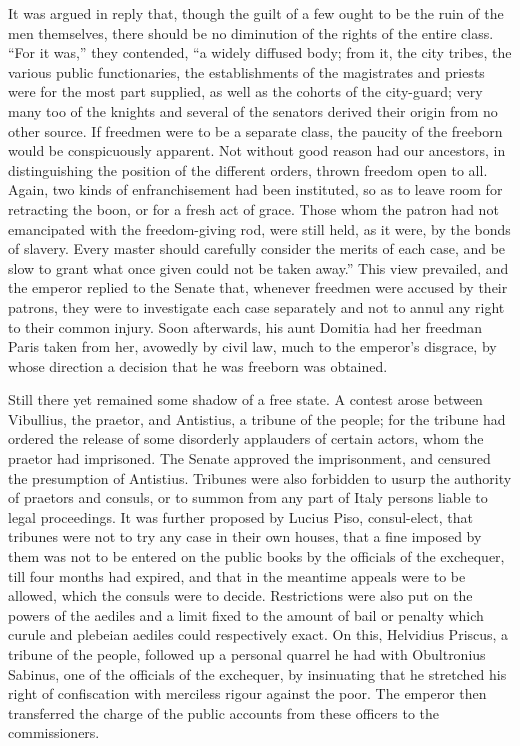 
It was argued in reply that, though the guilt of a few ought to be the ruin of the men themselves, there should be no diminution of the rights of the entire class. ``For it was,'' they contended, ``a widely diffused body; from it, the city tribes, the various public functionaries, the establishments of the magistrates and priests were for the most part supplied, as well as the cohorts of the city-guard; very many too of the knights and several of the senators derived their origin from no other source. If freedmen were to be a separate class, the paucity of the freeborn would be conspicuously apparent. Not without good reason had our ancestors, in distinguishing the position of the different orders, thrown freedom open to all. Again, two kinds of enfranchisement had been instituted, so as to leave room for retracting the boon, or for a fresh act of grace. Those whom the patron had not emancipated with the freedom-giving rod, were still held, as it were, by the bonds of slavery. Every master should carefully consider the merits of each case, and be slow to grant what once given could not be taken away.'' This view prevailed, and the emperor replied to the Senate that, whenever freedmen were accused by their patrons, they were to investigate each case separately and not to annul any right to their common injury. Soon afterwards, his aunt Domitia had her freedman Paris taken from her, avowedly by civil law, much to the emperor's disgrace, by whose direction a decision that he was freeborn was obtained.


Still there yet remained some shadow of a free state. A contest arose between Vibullius, the praetor, and Antistius, a tribune of the people; for the tribune had ordered the release of some disorderly applauders of certain actors, whom the praetor had imprisoned. The Senate approved the imprisonment, and censured the presumption of Antistius. Tribunes were also forbidden to usurp the authority of praetors and consuls, or to summon from any part of Italy persons liable to legal proceedings. It was further proposed by Lucius Piso, consul-elect, that tribunes were not to try any case in their own houses, that a fine imposed by them was not to be entered on the public books by the officials of the exchequer, till four months had expired, and that in the meantime appeals were to be allowed, which the consuls were to decide. Restrictions were also put on the powers of the aediles and a limit fixed to the amount of bail or penalty which curule and plebeian aediles could respectively exact. On this, Helvidius Priscus, a tribune of the people, followed up a personal quarrel he had with Obultronius Sabinus, one of the officials of the exchequer, by insinuating that he stretched his right of confiscation with merciless rigour against the poor. The emperor then transferred the charge of the public accounts from these officers to the commissioners.

